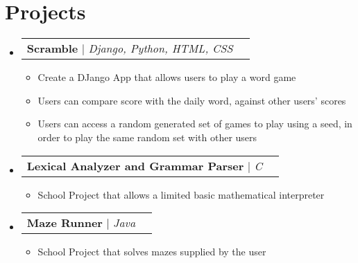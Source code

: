 \documentclass[letterpaper,11pt]{article}
\makeatletter
\newcommand{\resumeItem}[1]{
  \item\small{
    {#1 \vspace{-2pt}}
  }
}
\newcommand{\resumeProjectHeading}[2]{
    \item
    \begin{tabular*}{0.97\textwidth}{l@{\extracolsep{\fill}}r}
      \small#1 & #2 \\
    \end{tabular*}\vspace{-7pt}
}
\newcommand{\resumeSubHeadingListStart}{\begin{itemize}[leftmargin=0.15in, label={}]}
\newcommand{\resumeSubHeadingListEnd}{\end{itemize}}
\newcommand{\resumeItemListStart}{\begin{itemize}}
\newcommand{\resumeItemListEnd}{\end{itemize}\vspace{-5pt}}
\makeatother
\begin{document}
\section{Projects}
    \resumeSubHeadingListStart
        \resumeProjectHeading
            {\textbf{Scramble} $|$ \emph{Django, Python, HTML, CSS}}{}
            \resumeItemListStart
                \item {Create a DJango App that allows users to play a word game}
                \item {Users can compare score with the daily word, against other users' scores}
                \item {Users can access a random generated set of games to play using a seed, in order to play the same random set with other users}
            \resumeItemListEnd
        \resumeProjectHeading
            {\textbf{Lexical Analyzer and Grammar Parser} $|$ \emph{C}}{}
            \resumeItemListStart
                \resumeItem{School Project that allows a limited basic mathematical interpreter}
            \resumeItemListEnd
        \resumeProjectHeading
            {\textbf{Maze Runner} $|$ \emph{Java}}{}
            \resumeItemListStart
                \resumeItem{School Project that solves mazes supplied by the user}
            \resumeItemListEnd
    \resumeSubHeadingListEnd



%
\end{document}
